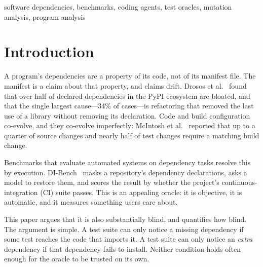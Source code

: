 \documentclass[10pt,conference]{IEEEtran}
\newcommand{\dibench}{DI-Bench}
\begin{document}
\begin{IEEEkeywords}
software dependencies, benchmarks, coding agents, test oracles,
mutation analysis, program analysis
\end{IEEEkeywords}

\section{Introduction}

A program's dependencies are a property of its code, not of its manifest
file. The manifest is a claim about that property, and claims drift.
Drosos et al.~\cite{drosos2024bloat} found that over half of declared
dependencies in the PyPI ecosystem are bloated, and that the single
largest cause---34\% of cases---is refactoring that removed the last use
of a library without removing its declaration. Code and build
configuration co-evolve, and they co-evolve imperfectly: McIntosh et
al.~\cite{mcintosh2011build} reported that up to a quarter of source
changes and nearly half of test changes require a matching build change.

Benchmarks that evaluate automated systems on dependency tasks resolve
this by execution. \dibench~\cite{dibench2025} masks a repository's
dependency declarations, asks a model to restore them, and scores the
result by whether the project's continuous-integration (CI) suite passes.
This is an appealing oracle: it is objective, it is automatic, and it
measures something users care about.

This paper argues that it is also substantially blind, and quantifies how
blind. The argument is simple. A test suite can only notice a missing
dependency if some test reaches the code that imports it. A test suite
can only notice an \emph{extra} dependency if that dependency fails to
install. Neither condition holds often enough for the oracle to be
trusted on its own.
\end{document}
